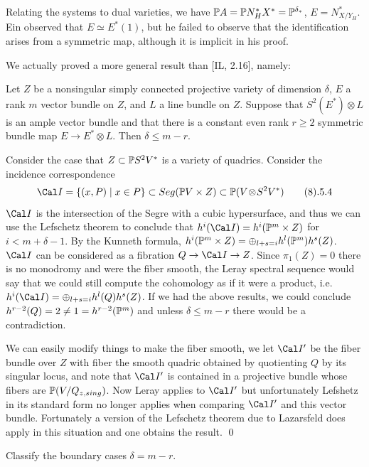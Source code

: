 \smallpagebreak

Relating the systems to dual
varieties, we have $\Bbb P A= \Bbb P N^*_HX^*=\Bbb P^{\delta_{*}}$,
$E= N^*_{X/Y_H}$. Ein observed that $E\simeq E^*(1)$, but he failed
to observe that the identification arises from a symmetric map, although
it is implicit in his proof.

We actually proved a more general result than
[IL, 2.16], namely:

 Let $Z$ be a nonsingular simply connected
projective variety of dimension $\delta$, $E$ a rank $m$ vector bundle on
$Z$,
and
$L$ a line bundle on $Z$. Suppose that $S^2(E^{*}) \otimes L$ is an ample 
vector bundle and that there is a constant even rank $r \ge 2$
symmetric bundle map $E \to E^{*} \otimes L$. Then $\delta \le m-r$.
\endproclaim

 

Consider the case that $Z\subset\Bbb P S^2 V^*$ is a 
variety of
quadrics. 
Consider the incidence correspondence
$$
\ci = \{ (x,P)\mid x\in P\}\subset Seg(\ppp V\times Z)
 \subset\ppp (V\ot S^2V^*)\tag 8.5.4
$$
$\ci$ is the intersection of the Segre with a cubic hypersurface,
and thus we can use the Lefschetz theorem to conclude that  $h^i(\ci )= h^i
(\pp m\times Z )$ for $i<m+\delta -1$. By the Kunneth formula,
$h^i (\Bbb P^{m}\times Z )= \oplus_{l+s=i}h^l(\Bbb P^{m})h^s(Z )$.
$\ci$ can be considered as a fibration $Q\ra\ci\ra Z$.
Since $\pi_1 (Z) =0$ there is no monodromy and were the fiber smooth,
the Leray spectral sequence would say that
we could still compute the cohomology
as if it were a product,
i.e. $h^i (\ci) =\oplus_{l+s=i}h^l(Q)h^s(Z )$.
If we had the above results, we could conclude  $h^{r-2}(Q)=2
\neq 1=h^{r-2}(\Bbb P^{m})$ and  unless
$\delta \le m-r$ there would be a contradiction.

We can easily modify things to make the fiber smooth, we 
let $\ci '$ be the fiber bundle over $Z$ with fiber the smooth quadric
obtained by quotienting $Q$ by its singular locus,
and note that $\ci '$ is contained in a   projective bundle  whose
fibers are $\Bbb P (V/Q_{z,sing})$. Now  Leray applies to $\ci '$ but
unfortunately Lefshetz in its standard form no longer applies 
when comparing $\ci '$ and this vector bundle. Fortunately  
  a  version of the Lefschetz theorem due to Lazarsfeld
  does apply in this situation and one obtains
the result. \qed\enddemo

 


 Classify the boundary cases $\delta
=m-r$.\endproclaim



